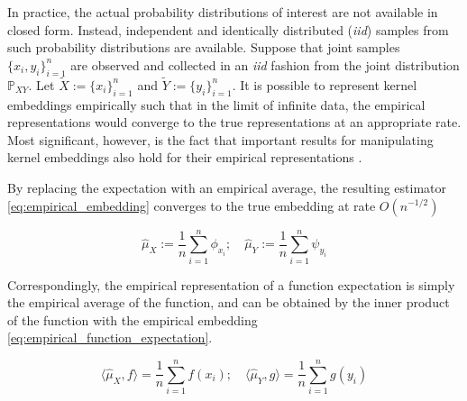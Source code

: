 \documentclass[twoside]{article} \usepackage{aistats2017}
\theoremstyle{definition}
\theoremstyle{theorem}
\newcommand{\rv}[1]{{#1}}
\newcommand{\ds}[1]{\tilde{#1}}
\newcommand{\inner}[2]{{\langle #1, #2 \rangle}}
\newcommand{\hatmuX}{\hat{\mu}_{\rv{X}}}
\newcommand{\hatmuY}{\hat{\mu}_{\rv{Y}}}
\begin{document}
			In practice, the actual probability distributions of interest are not available in closed form. Instead, independent and identically distributed (\textit{iid}) samples from such probability distributions are available. Suppose that joint samples $\{x_{i}, y_{i}\}_{i = 1}^{n}$ are observed and collected in an \textit{iid} fashion from the joint distribution $\mathbb{P}_{\rv{X} \rv{Y}}$. Let $\ds{X} := \{x_{i}\}_{i = 1}^{n}$ and $\ds{Y} := \{y_{i}\}_{i = 1}^{n}$. It is possible to represent kernel embeddings empirically such that in the limit of infinite data, the empirical representations would converge to the true representations at an appropriate rate. Most significant, however, is the fact that important results for manipulating kernel embeddings also hold for their empirical representations \citep{muandet2016kernel}.
			
			By replacing the expectation with an empirical average, the resulting estimator \eqref{eq:empirical_embedding} converges to the true embedding at rate $O(n^{-1/2})$ \citep{smola2007hilbert}

			\begin{equation}
				\hatmuX := \frac{1}{n} \sum_{i = 1}^{n} \phi_{x_{i}} ;\quad \hatmuY := \frac{1}{n} \sum_{i = 1}^{n} \psi_{y_{i}}
			\label{eq:empirical_embedding}
			\end{equation}

			Correspondingly, the empirical representation of a function expectation is simply the empirical average of the function, and can be obtained by the inner product of the function with the empirical embedding \eqref{eq:empirical_function_expectation}.

			\begin{equation}
				\inner{\hatmuX}{f} = \frac{1}{n} \sum_{i = 1}^{n} f(x_{i}) ;\quad \inner{\hatmuY}{g} = \frac{1}{n} \sum_{i = 1}^{n} g(y_{i})
			\label{eq:empirical_function_expectation}
			\end{equation}
\end{document}
